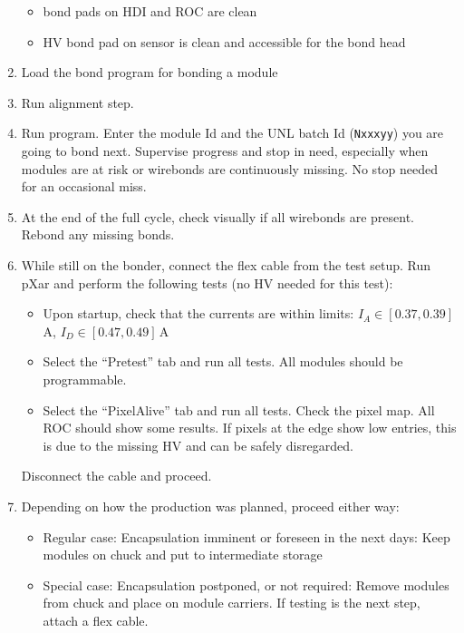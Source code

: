 \documentclass[12pt]{unlsilabsop}
\begin{document}
\begin{enumerate}
\begin{itemize}
        \item bond pads on HDI and ROC are clean
        \item HV bond pad on sensor is clean and accessible for the bond head
    \end{itemize}
    \item Load the bond program for bonding a module
    \item Run alignment step.
    \item Run program. Enter the module Id and the UNL batch Id (\texttt{Nxxxyy}) you are going to bond next. Supervise progress and stop in need, especially when modules are at risk or wirebonds are continuously missing. No stop needed for an occasional miss.
    \item At the end of the full cycle, check visually if all wirebonds are present. Rebond any missing bonds.
    \item While still on the bonder, connect the flex cable from the test setup. Run pXar and perform the following tests (no HV needed for this test):
    \begin{itemize}
        \item Upon startup, check that the currents are within limits: $I_A\in[0.37,0.39]\,$A, $I_D\in[0.47,0.49]\,$A
        \item Select the ``Pretest'' tab and run all tests. All modules should be programmable.
        \item Select the ``PixelAlive'' tab and run all tests. Check the pixel map. All ROC should show some results. If pixels at the edge show low entries, this is due to the missing HV and can be safely disregarded.
    \end{itemize}
    Disconnect the cable and proceed.
    \item Depending on how the production was planned, proceed either way:
    \begin{itemize}
        \item Regular case: Encapsulation imminent or foreseen in the next days: Keep modules on chuck and put to intermediate storage
        \item Special case: Encapsulation postponed, or not required: Remove modules from chuck and place on module carriers. If testing is the next step, attach a flex cable.
    \end{itemize}
\end{enumerate}
\end{document}

